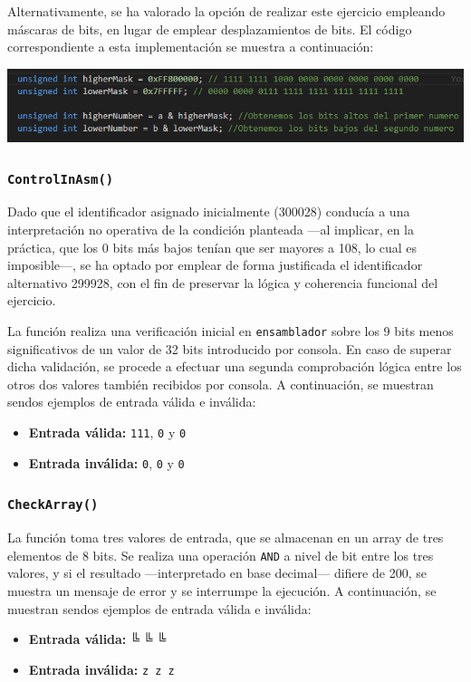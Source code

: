 \documentclass[11pt,a4paper]{article}
\begin{document}
\noindent Alternativamente, se ha valorado la opción de realizar este ejercicio empleando máscaras de bits, en lugar de emplear desplazamientos de bits. El código correspondiente a esta implementación se muestra a continuación: \vspace{2ex}
\begin{center}
  \includegraphics[width=1\textwidth]{alternativaPablo.png}
\end{center}

\vspace{3ex}

\subsubsection{\texttt{ControlInAsm()}}
\textcolor{naranjaDuro}{Dado que el identificador asignado inicialmente (300028) conducía a una interpretación no operativa de la condición planteada —al implicar, en la práctica, que los 0 bits más bajos tenían que ser mayores a 108, lo cual es imposible—, se ha optado por emplear de forma justificada el identificador alternativo 299928, con el fin de preservar la lógica y coherencia funcional del ejercicio.} \vspace{2ex}

\noindent La función realiza una verificación inicial en \texttt{ensamblador} sobre los 9 bits menos significativos de un valor de 32 bits introducido por consola. En caso de superar dicha validación, se procede a efectuar una segunda comprobación lógica entre los otros dos valores también recibidos por consola. A continuación, se muestran sendos ejemplos de entrada válida e inválida:
\begin{itemize}
  \item \textbf{Entrada válida:} \texttt{111}, \texttt{0} y \texttt{0}
  \item \textbf{Entrada inválida:} \texttt{0}, \texttt{0} y \texttt{0}
\end{itemize}
\vspace{3ex}

\subsubsection{\texttt{CheckArray()}}
La función toma tres valores de entrada, que se almacenan en un array de tres elementos de 8 bits. Se realiza una operación \texttt{AND} a nivel de bit entre los tres valores, y si el resultado —interpretado en base decimal— difiere de 200, se muestra un mensaje de error y se interrumpe la ejecución. A continuación, se muestran sendos ejemplos de entrada válida e inválida:
\begin{itemize}
  \item \textbf{Entrada válida:}  {\myfont ╚ ╚ ╚}
  \item \textbf{Entrada inválida:} \texttt{z z z}
\end{itemize}
\end{document}

